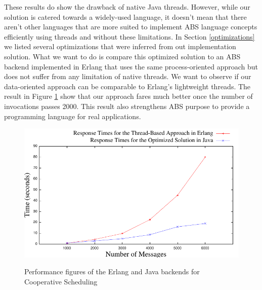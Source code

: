 \par These results do show the drawback of native Java threads. However, while our solution is catered towards a widely-used language, it doesn't mean that there aren't other languages that are more suited to implement ABS language concepts efficiently using threads and without these limitations. In Section \ref{optimizations} we listed several optimizations that were inferred from out implementation solution. What we want to do is compare this optimized solution to an ABS backend implemented in Erlang that uses the same process-oriented approach but does not suffer from any limitation of native threads. We want to observe if our data-oriented approach can be comparable to Erlang's lightweight threads. The result in Figure \ref{ej} show that our approach fares much better once the number of invocations passes 2000. This result also strengthens ABS purpose to provide a programming language for real applications.

\begin{figure}
	\caption{Performance figures of the Erlang and Java backends for Cooperative Scheduling}
	\centering
	\includegraphics[scale=0.8]{erlj8.pdf}
	\label{ej}
	
\end{figure}



